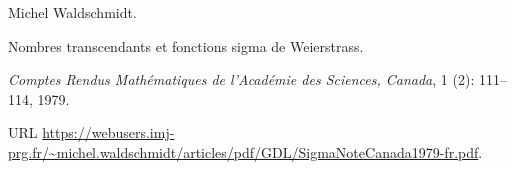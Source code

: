 Michel Waldschmidt.

\newblock Nombres transcendants et fonctions sigma de {Weierstrass}.

\newblock \emph{Comptes Rendus Math\'ematiques de l'Acad\'emie des Sciences,
  Canada}, 1 (2): 111--114, 1979.

\newblock URL
  \url{https://webusers.imj-prg.fr/~michel.waldschmidt/articles/pdf/GDL/SigmaNoteCanada1979-fr.pdf}.